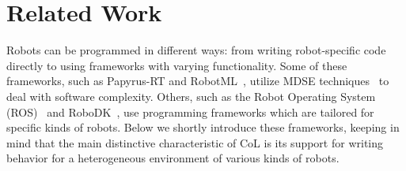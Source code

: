 \documentclass[runningheads]{llncs}
\begin{document}



\section{Related Work}

Robots can be programmed in different ways: from writing robot-specific code directly to using frameworks with varying functionality. 
Some of these frameworks, such as Papyrus-RT \cite{PAPYRUS-RT} and RobotML~\cite{Dhouib2012robotml}, utilize MDSE techniques~\cite{Brambilla2017,brugali2015model} to deal with software complexity.
Others, such as the Robot Operating System (ROS)~\cite{ROS} and RoboDK~\cite{RoboDK}, use programming frameworks which are tailored for specific kinds of robots.
Below we shortly introduce these frameworks, keeping in mind that the main distinctive characteristic of CoL is its support for writing behavior for a heterogeneous environment of various kinds of robots.
 
\end{document}
